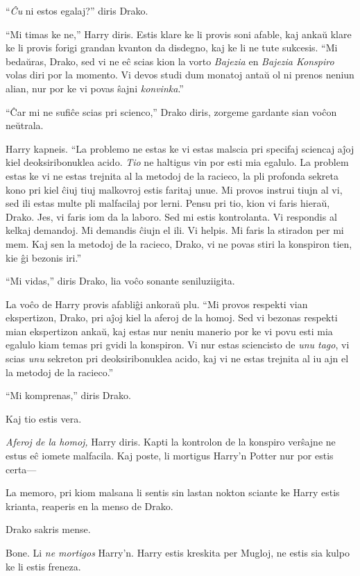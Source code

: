 ``\emph{Ĉu} ni estos egalaj?'' diris Drako.

``Mi timas ke ne,'' Harry diris. Estis klare ke li provis soni afable,
kaj ankaŭ klare ke li provis forigi grandan kvanton da disdegno, kaj
ke li ne tute sukcesis. ``Mi bedaŭras, Drako, sed vi ne eĉ scias kion
la vorto \emph{Bajezia} en \emph{Bajezia Konspiro} volas diri por la
momento. Vi devos studi dum monatoj antaŭ ol ni prenos neniun alian,
nur por ke vi povas ŝajni \emph{konvinka}.''

``Ĉar mi ne sufiĉe scias pri scienco,'' Drako diris, zorgeme gardante
sian voĉon neŭtrala.

Harry kapneis. ``La problemo ne estas ke vi estas malscia pri specifaj
sciencaj aĵoj kiel deoksiribonuklea acido. \emph{Tio} ne haltigus vin
por esti mia egalulo. La problem estas ke vi ne estas trejnita al la
metodoj de la racieco, la pli profonda sekreta kono pri kiel ĉiuj tiuj
malkovroj estis faritaj unue. Mi provos instrui tiujn al vi, sed ili
estas multe pli malfacilaj por lerni. Pensu pri tio, kion vi faris
hieraŭ, Drako. Jes, vi faris iom da la laboro. Sed mi estis
kontrolanta. Vi respondis al kelkaj demandoj. Mi demandis ĉiujn el
ili. Vi helpis. Mi faris la stiradon per mi mem. Kaj sen la metodoj de
la racieco, Drako, vi ne povas stiri la konspiron tien, kie ĝi bezonis
iri.''

``Mi vidas,'' diris Drako, lia voĉo sonante seniluziigita.

La voĉo de Harry provis afabliĝi ankoraŭ plu. ``Mi provos respekti
vian ekspertizon, Drako, pri aĵoj kiel la aferoj de la homoj. Sed vi
bezonas respekti mian ekspertizon ankaŭ, kaj estas nur neniu manerio
por ke vi povu esti mia egalulo kiam temas pri gvidi la konspiron. Vi
nur estas sciencisto de \emph{unu tago}, vi scias \emph{unu} sekreton
pri deoksiribonuklea acido, kaj vi ne estas trejnita al iu ajn el la
metodoj de la racieco.''

``Mi komprenas,'' diris Drako.

Kaj tio estis vera.

\emph{Aferoj de la homoj,} Harry diris. Kapti la kontrolon de la
konspiro verŝajne ne estus eĉ iomete malfacila. Kaj poste, li mortigus
Harry'n Potter nur por estis certa—

La memoro, pri kiom malsana li sentis sin lastan nokton sciante ke
Harry estis krianta, reaperis en la menso de Drako.

Drako sakris mense.

Bone. Li \emph{ne mortigos} Harry'n. Harry estis kreskita per Mugloj,
ne estis sia kulpo ke li estis freneza.

